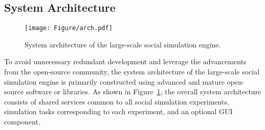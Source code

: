 \subsection{System Architecture}\label{sec:sim:arch}

\begin{figure}[ht]
\centering
\texttt{[image: Figure/arch.pdf]}
\caption{System architecture of the large-scale social simulation engine.}
\label{fig:arch}
\end{figure}




To avoid unnecessary redundant development and leverage the advancements from the open-source community, the system architecture of the large-scale social simulation engine is primarily constructed using advanced and mature open-source software or libraries.
As shown in Figure~\ref{fig:arch}, the overall system architecture consists of shared services common to all social simulation experiments, simulation tasks corresponding to each experiment, and an optional GUI component.

